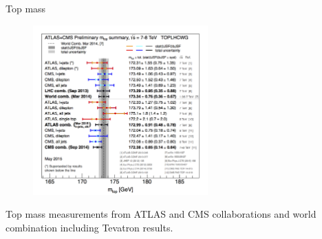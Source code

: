 \begin{frame}{Top mass}
\vspace{-.2cm}
\begin{figure}[!Hhtbp]
  \begin{center}
    \includegraphics[width=0.6\textwidth]{../figs/LHC_topmass_May2015.png}
  \end{center}
\end{figure}


\vspace{-.2cm}
    \begin{block}{}
      \tiny \centering Top mass measurements from ATLAS and CMS collaborations and world combination including Tevatron results.
    \end{block}

\end{frame}

